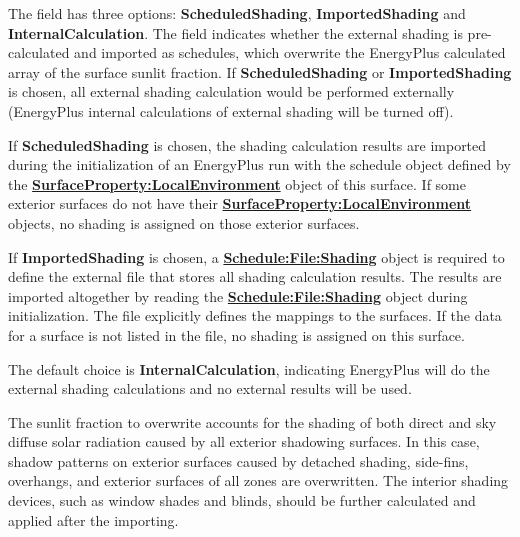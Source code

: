 The field has three options: \textbf{ScheduledShading}, \textbf{ImportedShading} and \textbf{InternalCalculation}. The field indicates whether the external shading is pre-calculated and imported as schedules, which overwrite the EnergyPlus calculated array of the surface sunlit fraction. If \textbf{ScheduledShading} or \textbf{ImportedShading} is chosen, all external shading calculation would be performed externally (EnergyPlus internal calculations of external shading will be turned off).

If \textbf{ScheduledShading} is chosen, the shading calculation results are imported during the initialization of an EnergyPlus run with the schedule object defined by the \textbf{\hyperref[surfacePropertylocalEnvironment]{SurfaceProperty:LocalEnvironment}} object of this surface. If some exterior surfaces do not have their \textbf{\hyperref[surfacePropertylocalEnvironment]{SurfaceProperty:LocalEnvironment}} objects, no shading is assigned on those exterior surfaces.

If \textbf{ImportedShading} is chosen, a \textbf{\hyperref[schedulefileshading]{Schedule:File:Shading}} object is required to define the external file that stores all shading calculation results. The results are imported altogether by reading the \textbf{\hyperref[schedulefileshading]{Schedule:File:Shading}} object during initialization. The file explicitly defines the mappings to the surfaces. If the data for a surface is not listed in the file, no shading is assigned on this surface.

The default choice is \textbf{InternalCalculation}, indicating EnergyPlus will do the external shading calculations and no external results will be used.

The sunlit fraction to overwrite accounts for the shading of both direct and sky diffuse solar radiation caused by all exterior shadowing surfaces. In this case, shadow patterns on exterior surfaces caused by detached shading, side-fins, overhangs, and exterior surfaces of all zones are overwritten. The interior shading devices, such as window shades and blinds, should be further calculated and applied after the importing.

